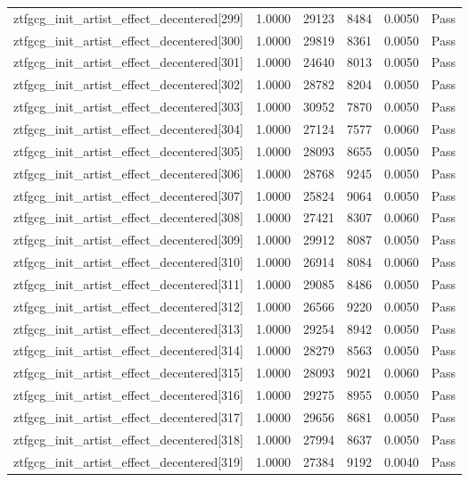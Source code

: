 \begin{table}[htbp]
\begin{tabular}{llrrll}
ztfgcg\_init\_artist\_effect\_decentered[299] & 1.0000 & 29123 & 8484 & 0.0050 & Pass \\
ztfgcg\_init\_artist\_effect\_decentered[300] & 1.0000 & 29819 & 8361 & 0.0050 & Pass \\
ztfgcg\_init\_artist\_effect\_decentered[301] & 1.0000 & 24640 & 8013 & 0.0050 & Pass \\
ztfgcg\_init\_artist\_effect\_decentered[302] & 1.0000 & 28782 & 8204 & 0.0050 & Pass \\
ztfgcg\_init\_artist\_effect\_decentered[303] & 1.0000 & 30952 & 7870 & 0.0050 & Pass \\
ztfgcg\_init\_artist\_effect\_decentered[304] & 1.0000 & 27124 & 7577 & 0.0060 & Pass \\
ztfgcg\_init\_artist\_effect\_decentered[305] & 1.0000 & 28093 & 8655 & 0.0050 & Pass \\
ztfgcg\_init\_artist\_effect\_decentered[306] & 1.0000 & 28768 & 9245 & 0.0050 & Pass \\
ztfgcg\_init\_artist\_effect\_decentered[307] & 1.0000 & 25824 & 9064 & 0.0050 & Pass \\
ztfgcg\_init\_artist\_effect\_decentered[308] & 1.0000 & 27421 & 8307 & 0.0060 & Pass \\
ztfgcg\_init\_artist\_effect\_decentered[309] & 1.0000 & 29912 & 8087 & 0.0050 & Pass \\
ztfgcg\_init\_artist\_effect\_decentered[310] & 1.0000 & 26914 & 8084 & 0.0060 & Pass \\
ztfgcg\_init\_artist\_effect\_decentered[311] & 1.0000 & 29085 & 8486 & 0.0050 & Pass \\
ztfgcg\_init\_artist\_effect\_decentered[312] & 1.0000 & 26566 & 9220 & 0.0050 & Pass \\
ztfgcg\_init\_artist\_effect\_decentered[313] & 1.0000 & 29254 & 8942 & 0.0050 & Pass \\
ztfgcg\_init\_artist\_effect\_decentered[314] & 1.0000 & 28279 & 8563 & 0.0050 & Pass \\
ztfgcg\_init\_artist\_effect\_decentered[315] & 1.0000 & 28093 & 9021 & 0.0060 & Pass \\
ztfgcg\_init\_artist\_effect\_decentered[316] & 1.0000 & 29275 & 8955 & 0.0050 & Pass \\
ztfgcg\_init\_artist\_effect\_decentered[317] & 1.0000 & 29656 & 8681 & 0.0050 & Pass \\
ztfgcg\_init\_artist\_effect\_decentered[318] & 1.0000 & 27994 & 8637 & 0.0050 & Pass \\
ztfgcg\_init\_artist\_effect\_decentered[319] & 1.0000 & 27384 & 9192 & 0.0040 & Pass \\

\end{tabular}
\end{table}
